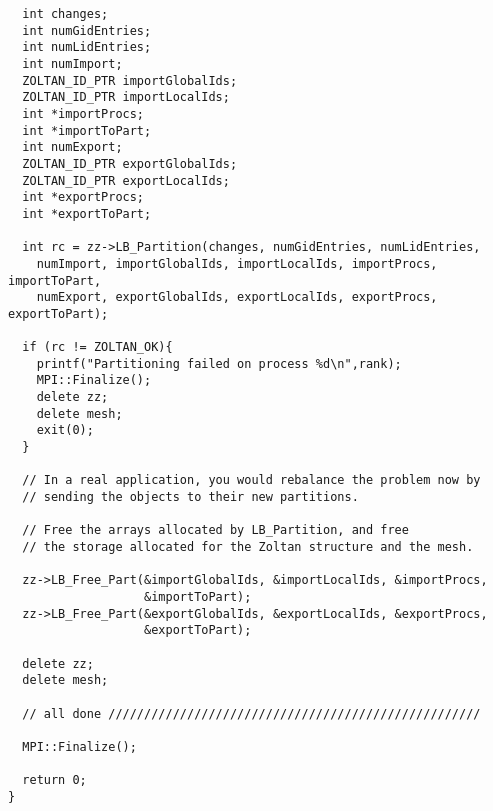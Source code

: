 \begin{flushleft}
\begin{verbatim}
  int changes;
  int numGidEntries;
  int numLidEntries;
  int numImport;
  ZOLTAN_ID_PTR importGlobalIds;
  ZOLTAN_ID_PTR importLocalIds;
  int *importProcs;
  int *importToPart;
  int numExport;
  ZOLTAN_ID_PTR exportGlobalIds;
  ZOLTAN_ID_PTR exportLocalIds;
  int *exportProcs;
  int *exportToPart;

  int rc = zz->LB_Partition(changes, numGidEntries, numLidEntries,
    numImport, importGlobalIds, importLocalIds, importProcs, importToPart,
    numExport, exportGlobalIds, exportLocalIds, exportProcs, exportToPart);
  
  if (rc != ZOLTAN_OK){
    printf("Partitioning failed on process %d\n",rank);
    MPI::Finalize();
    delete zz;
    delete mesh;
    exit(0);
  }

  // In a real application, you would rebalance the problem now by
  // sending the objects to their new partitions.

  // Free the arrays allocated by LB_Partition, and free
  // the storage allocated for the Zoltan structure and the mesh.

  zz->LB_Free_Part(&importGlobalIds, &importLocalIds, &importProcs,
                   &importToPart);
  zz->LB_Free_Part(&exportGlobalIds, &exportLocalIds, &exportProcs,
                   &exportToPart);

  delete zz;
  delete mesh;

  // all done ////////////////////////////////////////////////////

  MPI::Finalize();

  return 0;
}
\end{verbatim}
\end{flushleft}

